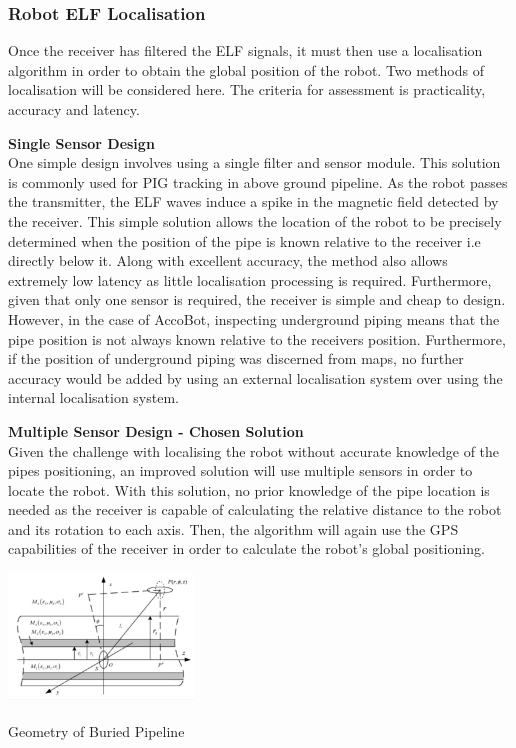 \documentclass[11pt]{article}		%
\newcommand{\supercite}[1]{\textsuperscript{\cite{#1}}}		%
\begin{document}
			\subsubsection{Robot ELF Localisation} \label{elfLocalisation}
			
			Once the receiver has filtered the ELF signals, it must then use a localisation algorithm in order to obtain the global position of the robot. Two methods of localisation will be considered here. The criteria for assessment is practicality, accuracy and latency. 
			
			\textbf{Single Sensor Design}
			\\
			One simple design involves using a single filter and sensor module. This solution is commonly used for PIG tracking in above ground pipeline. As the robot passes the transmitter, the ELF waves induce a spike in the magnetic field detected by the receiver. This simple solution allows the location of the robot to be precisely determined when the position of the pipe is known relative to the receiver i.e directly below it. Along with excellent accuracy, the method also allows extremely low latency as little localisation processing is required. Furthermore, given that only one sensor is required, the receiver is simple and cheap to design. 
			\\
	    	\hspace*{2ex}However, in the case of AccoBot, inspecting underground piping means that the pipe position is not always known relative to the receivers position. Furthermore, if the position of underground piping was discerned from maps, no further accuracy would be added by using an external localisation system over using the internal localisation system. 
	
	        \textbf{Multiple Sensor Design - Chosen Solution}
			\\
		    Given the challenge with localising the robot without accurate knowledge of the pipes positioning, an improved solution will use multiple sensors in order to locate the robot. With this solution, no prior knowledge of the pipe location is needed as the receiver is capable of calculating the relative distance to the robot and its rotation to each axis. Then, the algorithm will again use the GPS capabilities of the receiver in order to calculate the robot's global positioning.
			
			\begin{floatingfigure}[r]{0.4\textwidth}
				\centering
				\includegraphics[width=0.37\textwidth]{localisation}
				\caption{Geometry of Buried Pipeline\supercite{ELFTransmitter}}
				\label{localisation}
			\end{floatingfigure}
			
\end{document}
